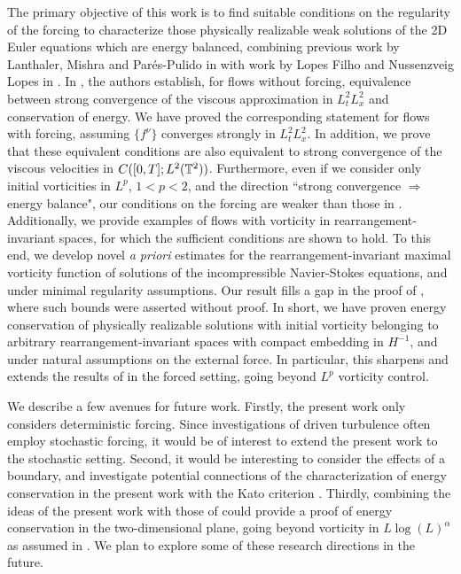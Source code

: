 \documentclass[reqno,12pt]{amsart}
\begin{document}
The primary objective of this work is to find suitable conditions on the regularity of the forcing to characterize those physically realizable weak
solutions of the 2D Euler equations which are energy balanced, combining previous work by Lanthaler, Mishra and Par\'{e}s-Pulido in \cite{LMPP2021a} with work by Lopes Filho and Nussenzveig Lopes in \cite{LN2022}. In \cite{LMPP2021a}, the authors establish, for flows without forcing, equivalence between strong convergence of the viscous approximation in $L^2_t L^2_x$ and conservation of energy. We have proved the corresponding statement for flows with forcing, assuming $\{f^{\nu}\}$ converges strongly in $L^2_t L^2_x$. In addition, we prove that these equivalent conditions are also equivalent to strong convergence of the viscous velocities in $C([0,T];L^2(\mathbb{T}^2))$. Furthermore, even if we consider only initial vorticities in $L^p$, $1<p<2$, and the direction ``strong convergence $\Longrightarrow$ energy balance", our conditions on the forcing are weaker than those in \cite{LN2022}. Additionally, we provide examples of flows with vorticity in rearrangement-invariant spaces, for which the sufficient conditions are shown to hold. To this end, we develop novel {\it a priori} estimates for the rearrangement-invariant maximal vorticity function of solutions of the incompressible Navier-Stokes equations, and under minimal regularity assumptions. Our result fills a gap in the proof of \cite[Corollary 2.13]{LMPP2021a}, where such bounds were asserted without proof. In short, we have proven energy conservation of physically realizable solutions with initial vorticity belonging to arbitrary rearrangement-invariant spaces with compact embedding in $H^{-1}$, and under natural assumptions on the external force. In particular, this sharpens and extends the results of \cite{LN2022} in the forced setting, going beyond $L^p$ vorticity control.


We describe  a few avenues for future work. Firstly, the present work only considers deterministic forcing. Since investigations of driven turbulence often employ stochastic forcing, it would be of interest to extend the present work to the stochastic setting. Second, it would be interesting to consider the effects of a boundary, and investigate potential connections of the characterization of energy conservation in the present work with the Kato criterion \cite{kato1984seminar}. Thirdly, combining the ideas of the present work with those of \cite{ciampa2022energy} could provide a proof of energy conservation in the two-dimensional plane, going beyond vorticity in $L \log(L)^\alpha$ as assumed in \cite{ciampa2022energy}. We plan to explore some of these research directions in the future.
\end{document}
